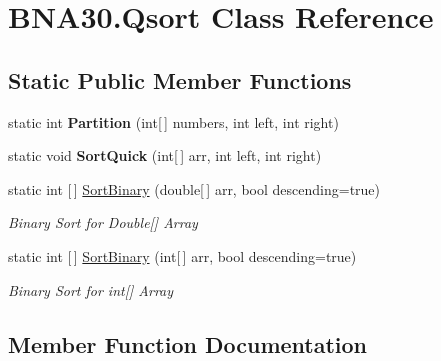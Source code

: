 \hypertarget{class_b_n_a30_1_1_qsort}{}\section{B\+N\+A30.\+Qsort Class Reference}
\label{class_b_n_a30_1_1_qsort}
\subsection*{Static Public Member Functions}
\begin{DoxyCompactItemize}
\item 
\mbox{\label{class_b_n_a30_1_1_qsort_afcc2924b3802c632001b9a77133be617}} 
static int {\bfseries Partition} (int\mbox{[}$\,$\mbox{]} numbers, int left, int right)
\item 
\mbox{\label{class_b_n_a30_1_1_qsort_aa47087168a41e0536e01674c27a3ad16}} 
static void {\bfseries Sort\+Quick} (int\mbox{[}$\,$\mbox{]} arr, int left, int right)
\item 
static int \mbox{[}$\,$\mbox{]} \mbox{\hyperlink{class_b_n_a30_1_1_qsort_a30dc940f17c2ec6966445cd0e28204f0}{Sort\+Binary}} (double\mbox{[}$\,$\mbox{]} arr, bool descending=true)
\begin{DoxyCompactList}\small\item\em Binary Sort for Double\mbox{[}\mbox{]} Array \end{DoxyCompactList}\item 
static int \mbox{[}$\,$\mbox{]} \mbox{\hyperlink{class_b_n_a30_1_1_qsort_ac539a354689cd62de39609383cf4ce52}{Sort\+Binary}} (int\mbox{[}$\,$\mbox{]} arr, bool descending=true)
\begin{DoxyCompactList}\small\item\em Binary Sort for int\mbox{[}\mbox{]} Array \end{DoxyCompactList}\end{DoxyCompactItemize}


\subsection{Member Function Documentation}
\mbox{\label{class_b_n_a30_1_1_qsort_a30dc940f17c2ec6966445cd0e28204f0}} 
